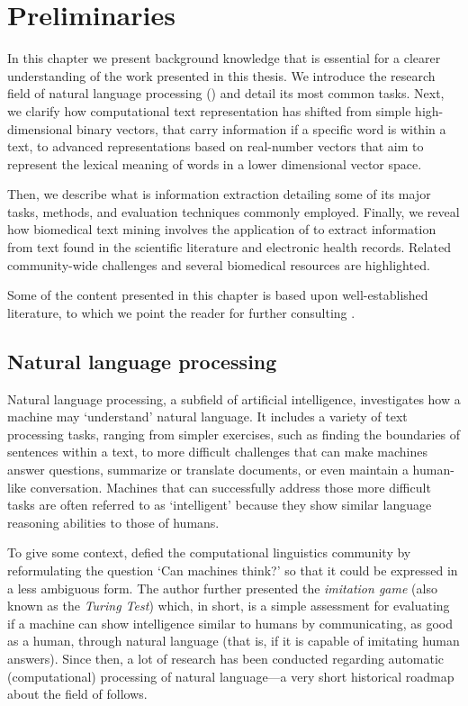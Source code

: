 \chapter{Preliminaries}
\label{c2}

In this chapter we present background knowledge that is essential for a clearer understanding of the work presented in this thesis.
We introduce the research field of natural language processing () and detail its most common tasks.
Next, we clarify how computational text representation has shifted from simple high-dimensional binary vectors, that carry information if a specific word is within a text, to advanced representations based on real-number vectors that aim to represent the lexical meaning of words in a lower dimensional vector space.

Then, we describe what is information extraction detailing some of its major tasks, methods, and evaluation techniques commonly employed.
Finally, we reveal how biomedical text mining involves the application of  to extract information from text found in the scientific literature and electronic health records.
Related community-wide challenges and several biomedical resources are highlighted.

Some of the content presented in this chapter is based upon well-established literature, to which we point the reader for further consulting \parencite{manning2008a,bird2009a,nadkarni2011a,ingersoll2013a,jurafsky2018a}.


\section{Natural language processing}

Natural language processing, a subfield of artificial intelligence, investigates how a machine may `understand' natural language.
It includes a variety of text processing tasks, ranging from simpler exercises, such as finding the boundaries of sentences within a text, to more difficult challenges that can make machines answer questions, summarize or translate documents, or even maintain a human-like conversation.
Machines that can successfully address those more difficult  tasks are often referred to as `intelligent' because they show similar language reasoning abilities to those of humans.

To give some context, \textcite{turing1950a} defied the computational linguistics community by reformulating the question `Can machines think?' so that it could be expressed in a less ambiguous form.
The author further presented the \textit{imitation game} (also known as the \textit{Turing Test}) which, in short, is a simple assessment for evaluating if a machine can show intelligence similar to humans by communicating, as good as a human, through natural language (that is, if it is capable of imitating human answers).
Since then, a lot of research has been conducted regarding automatic (computational) processing of natural language---a very short historical roadmap about the field of  follows.

